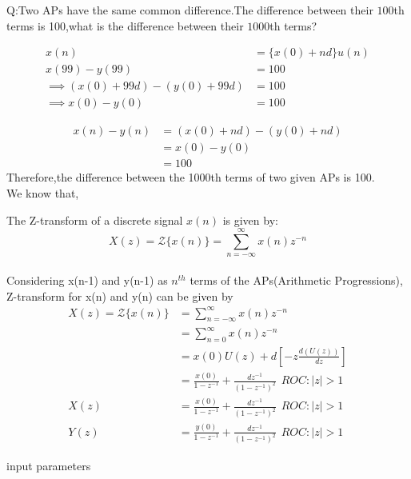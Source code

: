 \documentclass[journal,12pt,onecolumn]{IEEEtran}
\theoremstyle{remark}
\begin{document}
\let\vec\mathbf







\bigskip

\renewcommand{\thefigure}{\theenumi}
\renewcommand{\thetable}{\theenumi}

Q:Two APs have the same common difference.The difference between their $100${th} terms is 100,what is the difference between their $1000${th} terms?

\solution

\begin{align}
x(n) &= \{x(0)+nd\}u(n) \\
 x(99) - y(99) &= 100 \\
\implies (x(0) + 99d) - (y(0) + 99d) &= 100
 \\
\implies x(0) - y(0) &= 100
\end{align}

\begin{align}
x(n) - y(n) &= (x(0) + nd) - (y(0) + nd)\\
&= x(0) - y(0) \\
&= 100  
\end{align}
Therefore,the difference between the 1000th terms of two given APs is 100.\\

We know that,

The Z-transform of a discrete signal $x(n)$ is given by:
\[ X(z) = \mathcal{Z}\{x(n)\} = \sum_{n=-\infty}^{\infty} x(n)z^{-n} \]
\\ Considering x(n-1) and y(n-1) as $n^{th}$ terms of the APs(Arithmetic Progressions), Z-transform for x(n) and y(n) can be given by
\begin{align}
X(z) = \mathcal{Z}\{x(n)\} 
&=\sum_{n=-\infty}^{\infty} x(n)z^{-n} \\
&=\sum_{n=0}^{\infty}x(n)z^{-n} \\
&=x(0)U(z) + d[-z \frac {d(U(z))}{dz}] \\
&=\frac{x(0)}{1-z^{-1}} + \frac{dz^{-1}}{(1-z^{-1})^2} \hspace{5pt} ROC: |z|>1\\
X(z)&= \frac{x(0)}{1-z^{-1}} + \frac{dz^{-1}}{(1-z^{-1})^2} \hspace{5pt} ROC: |z|>1\\
Y(z)&= \frac{y(0)}{1-z^{-1}} + \frac{dz^{-1}}{(1-z^{-1})^2} \hspace{5pt} ROC: |z|>1
\end{align}
\begin{table}[!ht]
    \centering
        
    \caption{input parameters}
    \label{tab:10_5_3_12}
\end{table}
\end{document}
